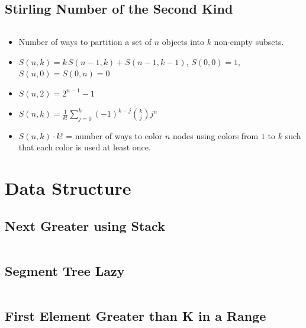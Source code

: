 \subsection{\small Stirling Number of the Second Kind  \scriptsize}
\inputminted[breaklines, breakanywhere]{c++}{code/04-Combinatorics and Probability/20-Stirling Number of the Second Kind.cpp}

{\footnotesize
\begin{itemize}
    \item Number of ways to partition a set of $n$ objects into $k$ non-empty subsets.

    \item $S(n,k) = k\, S(n-1,k) + S(n-1,k-1)$,\quad
          $S(0,0)=1$, \ $S(n,0)=S(0,n)=0$

    \item $S(n,2) = 2^{n-1} - 1$

    \item $\displaystyle S(n,k) = \frac{1}{k!} \sum_{j=0}^{k} (-1)^{k-j} \binom{k}{j} j^{n}$

    \item $S(n,k) \cdot k!$ = number of ways to color $n$ nodes using colors from $1$ to $k$ such that each color is used at least once.
\end{itemize}

}

\section{Data Structure}
\subsection{\small Next Greater using Stack  \scriptsize}
\inputminted[breaklines, breakanywhere]{c++}{code/05-Data Structure/01-Next Greater using Stack.cpp}

\subsection{\small Segment Tree Lazy  \scriptsize}
\inputminted[breaklines, breakanywhere]{c++}{code/05-Data Structure/02-Segment Tree Lazy.cpp}

\subsection{\small First Element Greater than K in a Range  \scriptsize}
\inputminted[breaklines, breakanywhere]{c++}{code/05-Data Structure/03-First Element Greater than K in a Range.cpp}

